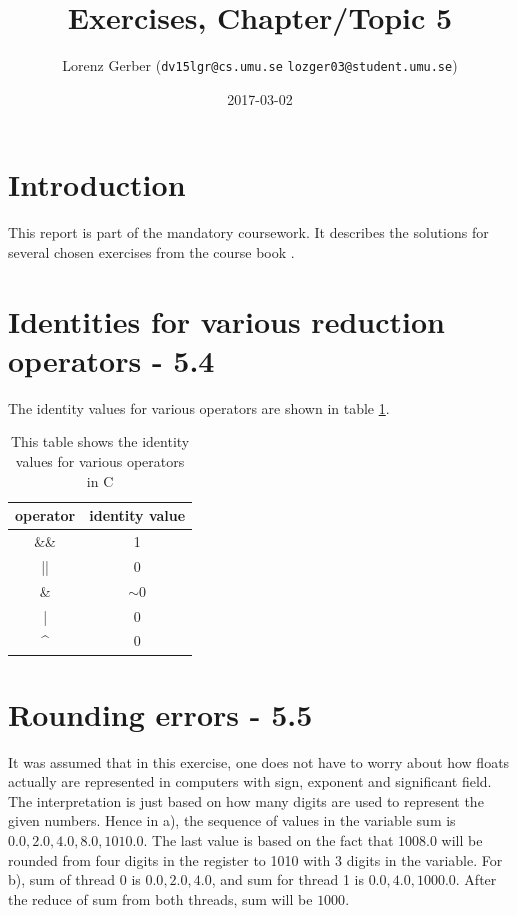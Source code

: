\documentclass[a4paper,11pt,twoside]{article}
\title{Exercises, Chapter/Topic 5}
\author{Lorenz Gerber ({\tt{dv15lgr@cs.umu.se}} {\tt{lozger03@student.umu.se}})}
\date{2017-03-02}
\begin{document}
\lstset{language=C}
\maketitle
\thispagestyle{empty}
\newpage
\tableofcontents
\thispagestyle{empty}
\newpage

\clearpage
{}

\section{Introduction}
This report is part of the mandatory coursework. It describes the solutions for several chosen exercises from the course book \cite{pacheco2011}.

\section{Identities for various reduction operators - 5.4}

The identity values for various operators are shown in table \ref{tab:identity}.

\begin{table}[]
  \centering
  \caption{This table shows the identity values for various operators in C}
  \label{tab:identity}
  \begin{tabular}{cc}
    \multicolumn{1}{l}{operator} & \multicolumn{1}{l}{identity value} \\ \hline
    \&\&                         & 1                                  \\
    ||                           & 0                                  \\
    \&                           & $\sim$0                            \\
    |                            & 0                                  \\
    \textasciicircum             & 0
  \end{tabular}
\end{table}

\section{Rounding errors - 5.5}
It was assumed that in this exercise, one does not have to worry about how floats actually are represented in computers with sign, exponent and significant field.
The interpretation is just based on how many digits are used to represent the given numbers. Hence in a), the sequence of values in the variable sum is ${0.0, 2.0, 4.0, 8.0, 1010.0}$. The last value is based on the fact that 1008.0 will be rounded from four digits in the register to 1010 with 3 digits in the variable.
For b), sum of thread 0 is ${0.0, 2.0, 4.0}$, and sum for thread 1 is ${0.0, 4.0, 1000.0}$. After the reduce of sum from both threads, sum will be $1000$.
\end{document}
